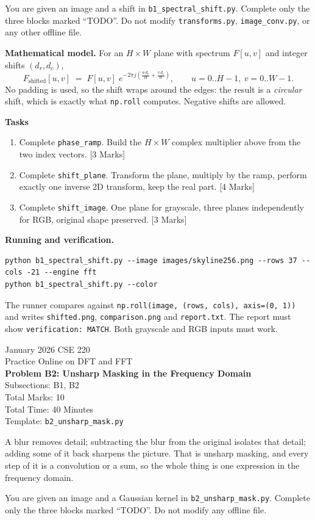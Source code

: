 \documentclass[11pt]{article}
\newcommand{\file}[1]{\texttt{#1}}
\newcommand{\code}[1]{\texttt{#1}}
\newcommand{\problemheader}[3]{%
  \begin{center}
    {\large January 2026 CSE 220}\\
    {\large Practice Online on DFT and FFT}\\[2pt]
    {\Large\bfseries #1}\\[2pt]
    Subsections: #2\\
    Total Marks: 10\\
    Total Time: 40 Minutes\\[2pt]
    {\small Template: \file{#3}}
  \end{center}
  \vspace{4pt}
}
\begin{document}
You are given an image and a shift in \file{b1\_spectral\_shift.py}. Complete
only the three blocks marked ``TODO''. Do not modify \file{transforms.py},
\file{image\_conv.py}, or any other offline file.

\textbf{Mathematical model.} For an $H \times W$ plane with spectrum $F[u,v]$
and integer shifts $(d_r, d_c)$,
\[
  F_{\text{shifted}}[u,v] \;=\; F[u,v]\; e^{-2\pi j \left( \frac{u\, d_r}{H} + \frac{v\, d_c}{W} \right)},
  \qquad u = 0..H-1,\ v = 0..W-1 .
\]
No padding is used, so the shift wraps around the edges: the result is a
\emph{circular} shift, which is exactly what \code{np.roll} computes. Negative
shifts are allowed.

\textbf{Tasks}
\begin{enumerate}[nosep]
  \item Complete \code{phase\_ramp}. Build the $H \times W$ complex multiplier
        above from the two index vectors.
        \hfill [3 Marks]
  \item Complete \code{shift\_plane}. Transform the plane, multiply by the
        ramp, perform exactly one inverse 2D transform, keep the real part.
        \hfill [4 Marks]
  \item Complete \code{shift\_image}. One plane for grayscale, three planes
        independently for RGB, original shape preserved.
        \hfill [3 Marks]
\end{enumerate}

\textbf{Running and verification.}
\begin{lstlisting}
python b1_spectral_shift.py --image images/skyline256.png --rows 37 --cols -21 --engine fft
python b1_spectral_shift.py --color
\end{lstlisting}
The runner compares against \code{np.roll(image, (rows, cols), axis=(0, 1))}
and writes \file{shifted.png}, \file{comparison.png} and \file{report.txt}. The
report must show \code{verification: MATCH}. Both grayscale and RGB inputs must
work.

\newpage
\problemheader{Problem B2: Unsharp Masking in the Frequency Domain}{B1, B2}{b2\_unsharp\_mask.py}

A blur removes detail; subtracting the blur from the original isolates that
detail; adding some of it back sharpens the picture. That is unsharp masking,
and every step of it is a convolution or a sum, so the whole thing is one
expression in the frequency domain.

You are given an image and a Gaussian kernel in \file{b2\_unsharp\_mask.py}.
Complete only the three blocks marked ``TODO''. Do not modify any offline file.
\end{document}
